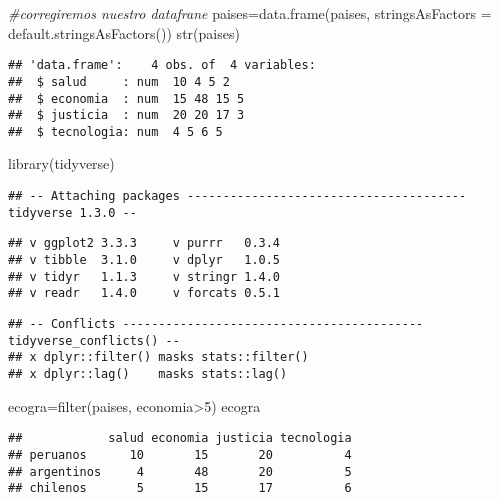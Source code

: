 \documentclass[
]{article}
\newenvironment{Shaded}{\begin{snugshade}}{\end{snugshade}}
\newcommand{\AttributeTok}[1]{\textcolor[rgb]{0.77,0.63,0.00}{#1}}
\newcommand{\CommentTok}[1]{\textcolor[rgb]{0.56,0.35,0.01}{\textit{#1}}}
\newcommand{\DecValTok}[1]{\textcolor[rgb]{0.00,0.00,0.81}{#1}}
\newcommand{\FunctionTok}[1]{\textcolor[rgb]{0.00,0.00,0.00}{#1}}
\newcommand{\NormalTok}[1]{#1}
\newcommand{\OtherTok}[1]{\textcolor[rgb]{0.56,0.35,0.01}{#1}}
\newcommand{\SpecialCharTok}[1]{\textcolor[rgb]{0.00,0.00,0.00}{#1}}
\begin{document}
\begin{Shaded}
\begin{Highlighting}[]
\CommentTok{\#corregiremos nuestro datafrane}
\NormalTok{paises}\OtherTok{=}\FunctionTok{data.frame}\NormalTok{(paises,  }\AttributeTok{stringsAsFactors =} \FunctionTok{default.stringsAsFactors}\NormalTok{())}
\FunctionTok{str}\NormalTok{(paises)}
\end{Highlighting}
\end{Shaded}

\begin{verbatim}
## 'data.frame':    4 obs. of  4 variables:
##  $ salud     : num  10 4 5 2
##  $ economia  : num  15 48 15 5
##  $ justicia  : num  20 20 17 3
##  $ tecnologia: num  4 5 6 5
\end{verbatim}

\begin{Shaded}
\begin{Highlighting}[]
\FunctionTok{library}\NormalTok{(tidyverse)}
\end{Highlighting}
\end{Shaded}

\begin{verbatim}
## -- Attaching packages --------------------------------------- tidyverse 1.3.0 --
\end{verbatim}

\begin{verbatim}
## v ggplot2 3.3.3     v purrr   0.3.4
## v tibble  3.1.0     v dplyr   1.0.5
## v tidyr   1.1.3     v stringr 1.4.0
## v readr   1.4.0     v forcats 0.5.1
\end{verbatim}

\begin{verbatim}
## -- Conflicts ------------------------------------------ tidyverse_conflicts() --
## x dplyr::filter() masks stats::filter()
## x dplyr::lag()    masks stats::lag()
\end{verbatim}

\begin{Shaded}
\begin{Highlighting}[]
\NormalTok{ecogra}\OtherTok{=}\FunctionTok{filter}\NormalTok{(paises, economia}\SpecialCharTok{\textgreater{}}\DecValTok{5}\NormalTok{)}
\NormalTok{ecogra}
\end{Highlighting}
\end{Shaded}

\begin{verbatim}
##            salud economia justicia tecnologia
## peruanos      10       15       20          4
## argentinos     4       48       20          5
## chilenos       5       15       17          6
\end{verbatim}
\end{document}
